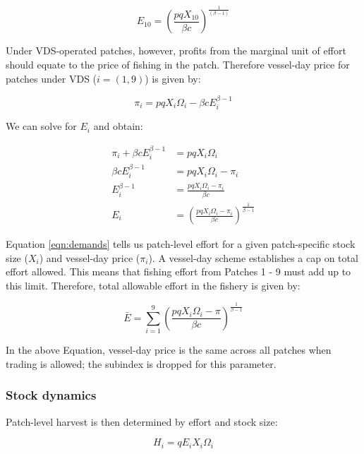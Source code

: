\documentclass[12pt]{article}
\begin{document}
\begin{equation}
E_{10} = \left(\frac{pqX_{10}}{\beta c}\right)^{\frac{1}{(\beta - 1)}}
\label{eqn:effort_hs}
\end{equation}

Under VDS-operated patches, however, profits from the marginal unit of effort should equate to the price of fishing in the patch. Therefore vessel-day price for patches under VDS ($i = (1, 9)$) is  given by:

$$
\pi_i = pqX_i\Omega_i - \beta c E_i ^{\beta - 1}
$$

\noindent We can solve for $E_i$ and obtain:

\begin{equation}
	\begin{split}
		\pi_i + \beta c E_i ^{\beta - 1} &= pqX_i\Omega_i \\
		\beta c E_i ^{\beta - 1} &= pqX_i\Omega_i - \pi_i \\
		E_i ^{\beta - 1} &= \frac{pqX_i\Omega_i - \pi_i}{\beta c} \\
		E_i &= \left(\frac{pqX_i\Omega_i - \pi_i}{\beta c }\right) ^ {\frac{1}{\beta - 1}}
	\end{split}
\label{eqn:demands}
\end{equation}

Equation \ref{eqn:demands} tells us patch-level effort for a given patch-specific stock size ($X_i$) and vessel-day price ($\pi_i$). A vessel-day scheme establishes a cap on total effort allowed. This means that fishing effort from Patches 1 - 9 must add up to this limit. Therefore, total allowable effort in the fishery is given by:

\begin{equation}
\bar{E} = \sum_{i = 1}^9\left(\frac{pqX_i\Omega_i - \pi}{\beta c }\right) ^ {\frac{1}{\beta - 1}}
\label{eqn:Ebar}
\end{equation}

\noindent In the above Equation, vessel-day price is the same across all patches when trading is allowed; the subindex is dropped for this parameter.

\subsubsection{Stock dynamics}

Patch-level harvest is then determined by effort and stock size:

\begin{equation}
H_i = qE_iX_i\Omega_i
\label{eqn:harvest}
\end{equation}
\end{document}

